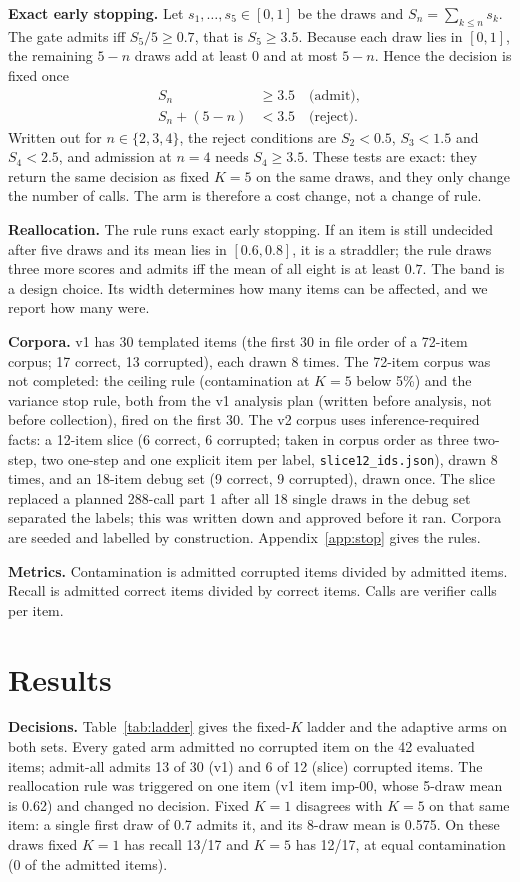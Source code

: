 \documentclass[11pt]{article}
\begin{document}
\textbf{Exact early stopping.} Let $s_1,\dots,s_5\in[0,1]$ be the draws and $S_n=\sum_{k\le n}s_k$. The gate admits iff $S_5/5\ge 0.7$, that is $S_5\ge 3.5$. Because each draw lies in $[0,1]$, the remaining $5-n$ draws add at least $0$ and at most $5-n$. Hence the decision is fixed once
\begin{align}
S_n&\ge 3.5 \quad\text{(admit)},\\
S_n+(5-n)&<3.5 \quad\text{(reject)}.
\end{align}
Written out for $n\in\{2,3,4\}$, the reject conditions are $S_2<0.5$, $S_3<1.5$ and $S_4<2.5$, and admission at $n{=}4$ needs $S_4\ge 3.5$. These tests are exact: they return the same decision as fixed $K{=}5$ on the same draws, and they only change the number of calls. The arm is therefore a cost change, not a change of rule.

\textbf{Reallocation.} The rule runs exact early stopping. If an item is still undecided after five draws and its mean lies in $[0.6,0.8]$, it is a straddler; the rule draws three more scores and admits iff the mean of all eight is at least $0.7$. The band is a design choice. Its width determines how many items can be affected, and we report how many were.

\textbf{Corpora.} v1 has 30 templated items (the first 30 in file order of a 72-item corpus; 17 correct, 13 corrupted), each drawn 8 times. The 72-item corpus was not completed: the ceiling rule (contamination at $K{=}5$ below 5\%) and the variance stop rule, both from the v1 analysis plan (written before analysis, not before collection), fired on the first 30. The v2 corpus uses inference-required facts: a 12-item slice (6 correct, 6 corrupted; taken in corpus order as three two-step, two one-step and one explicit item per label, \texttt{slice12\_ids.json}), drawn 8 times, and an 18-item debug set (9 correct, 9 corrupted), drawn once. The slice replaced a planned 288-call part 1 after all 18 single draws in the debug set separated the labels; this was written down and approved before it ran. Corpora are seeded and labelled by construction. Appendix~\ref{app:stop} gives the rules.

\textbf{Metrics.} Contamination is admitted corrupted items divided by admitted items. Recall is admitted correct items divided by correct items. Calls are verifier calls per item.

\section{Results}
\textbf{Decisions.} Table~\ref{tab:ladder} gives the fixed-$K$ ladder and the adaptive arms on both sets. Every gated arm admitted no corrupted item on the 42 evaluated items; admit-all admits 13 of 30 (v1) and 6 of 12 (slice) corrupted items. The reallocation rule was triggered on one item (v1 item imp-00, whose 5-draw mean is 0.62) and changed no decision. Fixed $K{=}1$ disagrees with $K{=}5$ on that same item: a single first draw of 0.7 admits it, and its 8-draw mean is 0.575. On these draws fixed $K{=}1$ has recall 13/17 and $K{=}5$ has 12/17, at equal contamination (0 of the admitted items).
\end{document}
